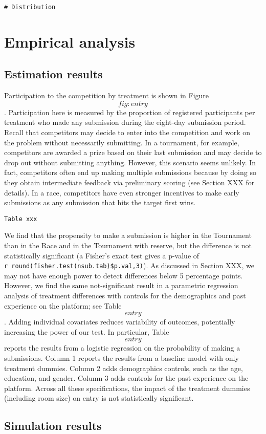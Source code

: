 \documentclass[12pt,]{article}
\begin{document}
\begin{verbatim}
# Distribution
\end{verbatim}

\section{Empirical analysis}\label{empirical-analysis}

\subsection{Estimation results}\label{estimation-results}

Participation to the competition by treatment is shown in Figure
\[fig:entry\]. Participation here is measured by the proportion of
registered participants per treatment who made any submission during the
eight-day submission period. Recall that competitors may decide to enter
into the competition and work on the problem without necessarily
submitting. In a tournament, for example, competitors are awarded a
prize based on their last submission and may decide to drop out without
submitting anything. However, this scenario seems unlikely. In fact,
competitors often end up making multiple submissions because by doing so
they obtain intermediate feedback via preliminary scoring (see Section
XXX for details). In a race, competitors have even stronger incentives
to make early submissions as any submission that hits the target first
wins.

\begin{verbatim}
Table xxx
\end{verbatim}

We find that the propensity to make a submission is higher in the
Tournament than in the Race and in the Tournament with reserve, but the
difference is not statistically significant (a Fisher's exact test gives
a p-value of \texttt{r~round(fisher.test(nsub.tab)\$p.val,3)}). As
discussed in Section XXX, we may not have enough power to detect
differences below 5 percentage points. However, we find the same
not-significant result in a parametric regression analysis of treatment
differences with controls for the demographics and past experience on
the platform; see Table \[entry\]. Adding individual covariates reduces
variability of outcomes, potentially increasing the power of our test.
In particular, Table \[entry\] reports the results from a logistic
regression on the probability of making a submissions. Column 1 reports
the results from a baseline model with only treatment dummies. Column 2
adds demographics controls, such as the age, education, and gender.
Column 3 adds controls for the past experience on the platform. Across
all these specifications, the impact of the treatment dummies (including
room size) on entry is not statistically significant.

\subsection{Simulation results}\label{simulation-results}

\renewcommand\refname{References}

\end{document}

